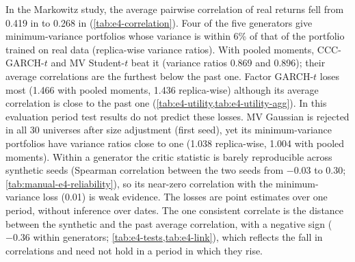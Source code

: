 In the Markowitz study, the average pairwise correlation of real returns fell from 0.419 in
\TRAIN{} to 0.268 in \TEST{} (\cref{tab:e4-correlation}). Four of the five generators give
minimum-variance portfolios whose \TEST{} variance is within 6\% of that of the portfolio trained
on real data (replica-wise variance ratios). With pooled moments, CCC-GARCH-$t$ and MV Student-$t$
beat it (variance ratios 0.869 and 0.896); their average correlations are the furthest below the
past one. Factor GARCH-$t$ loses most (1.466 with pooled moments, 1.436 replica-wise) although its
average correlation is close to the past one (\cref{tab:e4-utility,tab:e4-utility-agg}). In this
evaluation period test results do not predict these losses. MV Gaussian is rejected in all 30
universes after size adjustment (first seed), yet its minimum-variance portfolios have \TEST{}
variance ratios close to one (1.038 replica-wise, 1.004 with pooled moments). Within a generator
the critic statistic is barely reproducible across synthetic seeds (Spearman correlation between
the two seeds from $-0.03$ to 0.30; \cref{tab:manual-e4-reliability}), so its near-zero
correlation with the minimum-variance loss (0.01) is weak evidence. The losses are point
estimates over one \TEST{} period, without inference over dates. The one consistent correlate is the distance between the synthetic and the past average correlation, with
a negative sign ($-0.36$ within generators; \cref{tab:e4-tests,tab:e4-link}), which reflects the
fall in correlations and need not hold in a period in which they rise.

